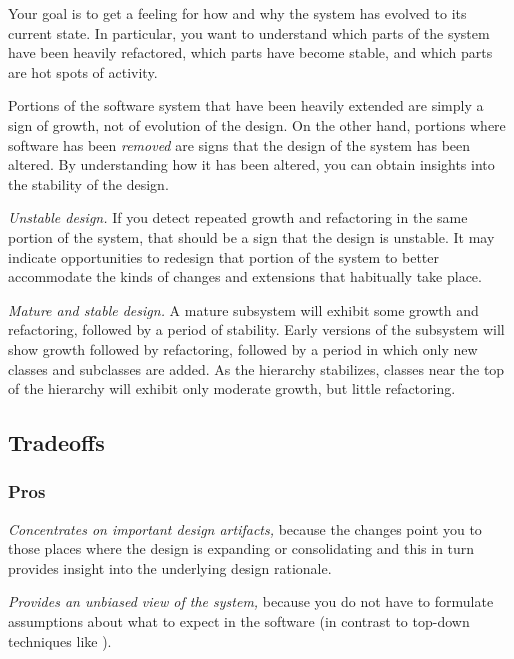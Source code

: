 \documentclass[a4paper,10pt,twoside]{book}
\begin{document}
Your goal is to get a feeling for how and why the system has evolved to its current state. In particular, you want to understand which parts of the system have been heavily refactored, which parts have become stable, and which parts are hot spots of activity.

Portions of the software system that have been heavily extended are simply a sign of growth, not of evolution of the design. On the other hand, portions where software has been \emph{removed} are signs that the design of the system has been altered. By understanding how it has been altered, you can obtain insights into the stability of the design.

\noindent
\emph{Unstable design.}
If you detect repeated growth and refactoring in the same portion of the system, that should be a sign that the design is unstable. It may indicate opportunities to redesign that portion of the system to better accommodate the kinds of changes and extensions that habitually take place.

\noindent
\emph{Mature and stable design.}
A mature subsystem will exhibit some growth and refactoring, followed by a period of stability. Early versions of the subsystem will show growth followed by refactoring, followed by a period in which only new classes and subclasses are added. As the hierarchy stabilizes, classes near the top of the hierarchy will exhibit only moderate growth, but little refactoring.

\subsection*{Tradeoffs}

\subsubsection*{Pros}

\begin{bulletlist}
\item \emph{Concentrates on important design artifacts,}
because the changes point you to those places where the design is expanding or consolidating and this in turn provides insight into the underlying design rationale.

\item \emph{Provides an unbiased view of the system,}
because you do not have to formulate assumptions about what to expect in the software (in contrast to top-down techniques like ).
\end{bulletlist}
\end{document}
